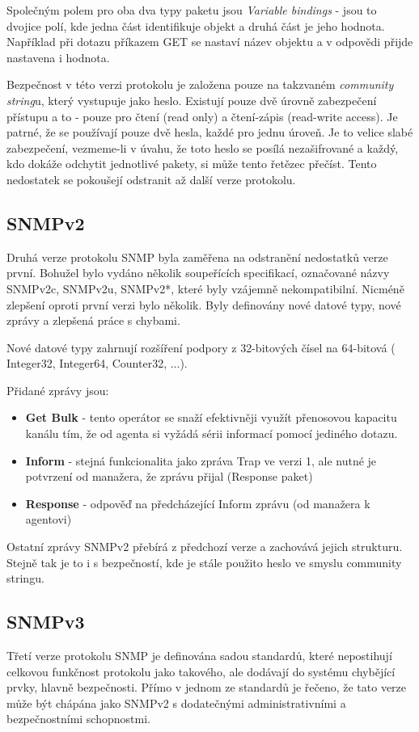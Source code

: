 Společným polem pro oba dva typy paketu jsou \textit{Variable bindings} - jsou to dvojice polí, kde jedna část identifikuje objekt a druhá část je jeho hodnota. Například
při dotazu příkazem GET se nastaví název objektu a v odpovědi přijde nastavena i hodnota.

Bezpečnost v této verzi protokolu je založena pouze na takzvaném \textit{community string}u, který vystupuje jako heslo. Existují pouze dvě úrovně zabezpečení
přístupu a to - pouze pro čtení (read only) a čtení-zápis (read-write access). Je patrné, že se používají pouze dvě hesla, každé pro jednu úroveň. Je to velice slabé
zabezpečení, vezmeme-li v úvahu, že toto heslo se posílá nezašifrované a každý, kdo dokáže odchytit jednotlivé pakety, si může tento řetězec přečíst. Tento nedostatek
se pokoušejí odstranit až další verze protokolu.

\subsection*{SNMPv2}
Druhá verze protokolu SNMP byla zaměřena na odstranění nedostatků verze první. Bohužel bylo vydáno několik soupeřících specifikací, označované názvy SNMPv2c, SNMPv2u, SNMPv2*, které
byly vzájemně nekompatibilní. Nicméně zlepšení oproti první verzi bylo několik. Byly definovány nové datové typy, nové zprávy a zlepšená práce s chybami.

Nové datové typy zahrnují rozšíření podpory z 32-bitových čísel na 64-bitová ( Integer32, Integer64, Counter32, ...). 

Přidané zprávy jsou:
\begin{itemize}
	\item \textbf{Get Bulk} - tento operátor se snaží efektivněji využít přenosovou kapacitu kanálu tím, že od agenta si vyžádá sérii informací pomocí jediného dotazu.
	\item \textbf{Inform} - stejná funkcionalita jako zpráva Trap ve verzi 1, ale nutné je potvrzení od manažera, že zprávu přijal (Response paket)
	\item \textbf{Response} - odpověď na předcházející Inform zprávu (od manažera k agentovi)
\end{itemize}

Ostatní zprávy SNMPv2 přebírá z předchozí verze a zachovává jejich strukturu. Stejně tak je to i s bezpečností, kde je stále použito heslo ve smyslu community stringu.

\subsection*{SNMPv3}
Třetí verze protokolu SNMP je definována sadou standardů, které nepostihují celkovou funkčnost protokolu jako takového, ale 
dodávají do systému chybějící prvky, hlavně bezpečnosti. Přímo v jednom ze standardů \cite{rfc2570} je řečeno, že tato verze může být chápána jako 
SNMPv2 s dodatečnými administrativními a bezpečnostními schopnostmi.

